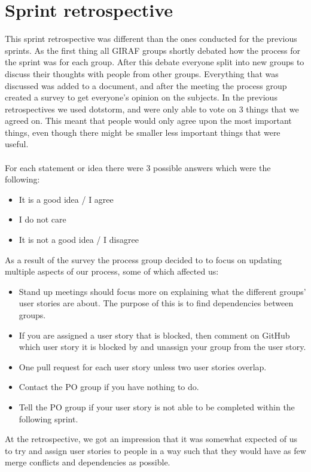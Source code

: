 \section{Sprint retrospective}\label{sprint-3-retrospective}
This sprint retrospective was different than the ones conducted for the previous sprints.
As the first thing all GIRAF groups shortly debated how the process for the sprint was for each group.
After this debate everyone split into new groups to discuss their thoughts with people from other groups.
Everything that was discussed was added to a document, and after the meeting the process group created a survey to get everyone's opinion on the subjects.
In the previous retrospectives we used dotstorm, and were only able to vote on 3 things that we agreed on.
This meant that people would only agree upon the most important things, even though there might be smaller less important things that were useful.
\\\\
For each statement or idea there were 3 possible answers which were the following:
\begin{itemize}
    \item It is a good idea / I agree
    \item I do not care
    \item It is not a good idea / I disagree
\end{itemize}
As a result of the survey the process group decided to to focus on updating multiple aspects of our process, some of which affected us:
\begin{itemize}
    \item Stand up meetings should focus more on explaining what the different groups' user stories are about. The purpose of this is to find dependencies between groups.
    \item If you are assigned a user story that is blocked, then comment on GitHub which user story it is blocked by and unassign your group from the user story.
    \item One pull request for each user story unless two user stories overlap.
    \item Contact the PO group if you have nothing to do.
    \item Tell the PO group if your user story is not able to be completed within the following sprint.
\end{itemize}
\noindent
At the retrospective, we got an impression that it was somewhat expected of us to try and assign user stories to people in a way such that they would have as few merge conflicts and dependencies as possible.
